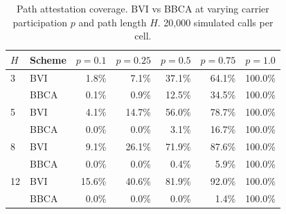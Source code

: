 \begin{table}[t]
\centering
\caption{Path attestation coverage. BVI vs BBCA at varying carrier participation $p$ and path length $H$. 20,000 simulated calls per cell.}
\label{tab:path}
\begin{tabular}{llrrrrr}
\toprule
$H$ & Scheme & $p=0.1$ & $p=0.25$ & $p=0.5$ & $p=0.75$ & $p=1.0$ \\
\midrule
3 & BVI & 1.8\% & 7.1\% & 37.1\% & 64.1\% & 100.0\% \\
 & BBCA & 0.1\% & 0.9\% & 12.5\% & 34.5\% & 100.0\% \\
5 & BVI & 4.1\% & 14.7\% & 56.0\% & 78.7\% & 100.0\% \\
 & BBCA & 0.0\% & 0.0\% & 3.1\% & 16.7\% & 100.0\% \\
8 & BVI & 9.1\% & 26.1\% & 71.9\% & 87.6\% & 100.0\% \\
 & BBCA & 0.0\% & 0.0\% & 0.4\% & 5.9\% & 100.0\% \\
12 & BVI & 15.6\% & 40.6\% & 81.9\% & 92.0\% & 100.0\% \\
 & BBCA & 0.0\% & 0.0\% & 0.0\% & 1.4\% & 100.0\% \\
\bottomrule
\end{tabular}
\end{table}